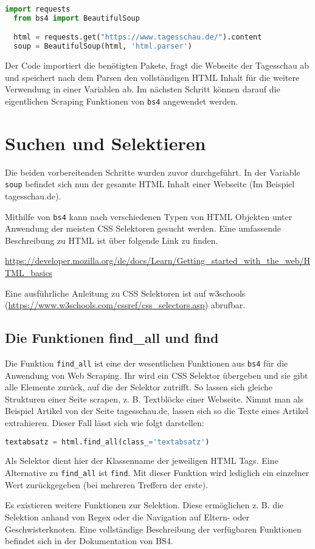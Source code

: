 \begin{lstlisting}[language=Python,gobble=2]
  import requests
  from bs4 import BeautifulSoup

  html = requests.get("https://www.tagesschau.de/").content
  soup = BeautifulSoup(html, 'html.parser')
\end{lstlisting}

Der Code importiert die benötigten Pakete, fragt die Webseite der Tagesschau ab
und speichert nach dem Parsen den vollständigen HTML Inhalt für die weitere Verwendung in einer Variablen ab.
Im nächsten Schritt können darauf die eigentlichen Scraping Funktionen von \texttt{bs4} angewendet werden.

\section{Suchen und Selektieren}

Die beiden vorbereitenden Schritte wurden zuvor durchgeführt.
In der Variable \texttt{soup} befindet sich nun der gesamte HTML Inhalt einer Webseite (Im Beispiel tagesschau.de).

Mithilfe von \texttt{bs4} kann nach verschiedenen Typen von HTML Objekten unter Anwendung der meisten CSS Selektoren gesucht werden.
Eine umfassende Beschreibung zu HTML\cite{mozilla-html} ist über folgende Link zu finden.

\url{https://developer.mozilla.org/de/docs/Learn/Getting_started_with_the_web/HTML_basics}

Eine ausführliche Anleitung zu CSS Selektoren ist auf w3schools (\url{https://www.w3schools.com/cssref/css_selectors.asp}) abrufbar\cite{css-ref}.

\subsection{Die Funktionen find\_all und find}

Die Funktion \texttt{find\_all} ist eine der wesentlichen Funktionen aus \texttt{bs4} für die Anwendung von Web Scraping.
Ihr wird ein CSS Selektor übergeben und sie gibt alle Elemente zurück, auf die der Selektor zutrifft\cite{bs4-find-all}. 
So lassen sich gleiche Strukturen einer Seite scrapen, 
z. B. Textblöcke einer Webseite. 
Nimmt man als Beispiel Artikel von der Seite tagesschau.de, 
lassen sich so die Texte eines Artikel extrahieren. 
Dieser Fall lässt sich wie folgt darstellen:

\begin{lstlisting}[language=Python,gobble=2]
  textabsatz = html.find_all(class_='textabsatz')
\end{lstlisting}

Als Selektor dient hier der Klassenname der jeweiligen HTML Tags. Eine Alternative zu \texttt{find\_all} ist \texttt{find}.
Mit dieser Funktion wird lediglich ein einzelner Wert zurückgegeben (bei mehreren Treffern der erste).

Es existieren weitere Funktionen zur Selektion.
Diese ermöglichen z. B. die Selektion anhand von Regex
oder die Navigation auf Eltern- oder Geschwisterknoten. 
Eine vollständige Beschreibung der verfügbaren Funktionen befindet sich in der Dokumentation von BS4\cite{bs4}.


